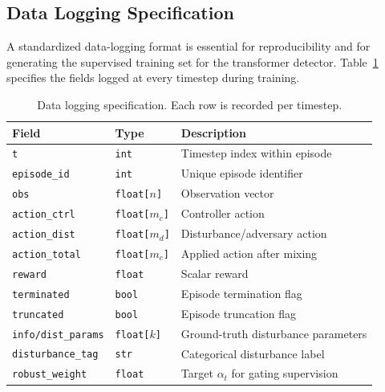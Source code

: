\documentclass[conference]{IEEEtran}
\begin{document}
\subsection{Data Logging Specification}\label{sec:data_logging}

A standardized data-logging format is essential for reproducibility and
for generating the supervised training set for the transformer detector.
Table~\ref{tab:data_fields} specifies the fields logged at every timestep
during training.

\begin{table}[t]
\centering
\caption{Data logging specification.  Each row is recorded per timestep.}
\label{tab:data_fields}
\small
\begin{tabular}{@{}llp{4.0cm}@{}}
\toprule
\textbf{Field} & \textbf{Type} & \textbf{Description} \\
\midrule
\texttt{t} & \texttt{int} & Timestep index within episode \\
\texttt{episode\_id} & \texttt{int} & Unique episode identifier \\
\texttt{obs} & \texttt{float[$n$]} & Observation vector \\
\texttt{action\_ctrl} & \texttt{float[$m_c$]} & Controller action \\
\texttt{action\_dist} & \texttt{float[$m_d$]} & Disturbance/adversary action \\
\texttt{action\_total} & \texttt{float[$m_c$]} & Applied action after mixing \\
\texttt{reward} & \texttt{float} & Scalar reward \\
\texttt{terminated} & \texttt{bool} & Episode termination flag \\
\texttt{truncated} & \texttt{bool} & Episode truncation flag \\
\texttt{info/dist\_params} & \texttt{float[$k$]} & Ground-truth disturbance parameters \\
\texttt{disturbance\_tag} & \texttt{str} & Categorical disturbance label \\
\texttt{robust\_weight} & \texttt{float} & Target $\alpha_t$ for gating supervision \\
\bottomrule
\end{tabular}
\vspace{-0.3cm}
\end{table}
\end{document}
